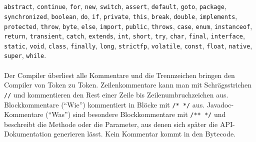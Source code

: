\\\\
\texttt{abstract}, \texttt{continue}, \texttt{for}, \texttt{new}, \texttt{switch}, \texttt{assert}, \texttt{default}, \texttt{goto}, \texttt{package}, \texttt{synchronized}, \texttt{boolean}, \texttt{do}, \texttt{if}, \texttt{private}, \texttt{this}, \texttt{break}, \texttt{double}, \texttt{implements}, \texttt{protected}, \texttt{throw}, \texttt{byte}, \texttt{else}, \texttt{import}, \texttt{public}, \texttt{throws}, \texttt{case}, \texttt{enum}, \texttt{instanceof}, \texttt{return}, \texttt{transient}, \texttt{catch}, \texttt{extends}, \texttt{int}, \texttt{short}, \texttt{try}, \texttt{char}, \texttt{final}, \texttt{interface}, \texttt{static}, \texttt{void}, \texttt{class}, \texttt{finally}, \texttt{long}, \texttt{strictfp}, \texttt{volatile}, \texttt{const}, \texttt{float}, \texttt{native}, \texttt{super}, \texttt{while}.
\\\\
Der Compiler überliest alle Kommentare und die Trennzeichen bringen den Compiler von Token zu Token. Zeilenkommentare kann man mit Schrägsstrichen \texttt{//} und kommentieren den Rest einer Zeile bis Zeilenumbruchzeichen aus. Blockkommentare (``Wie'') kommentiert in Blöcke mit \texttt{/* */} aus. Javadoc-Kommentare (``Was'') sind besondere Blockkommentare mit \texttt{/** */} und beschreibt die Methode oder die Parameter, aus denen sich später die API-Dokumentation generieren lässt. Kein Kommentar kommt in den Bytecode.

